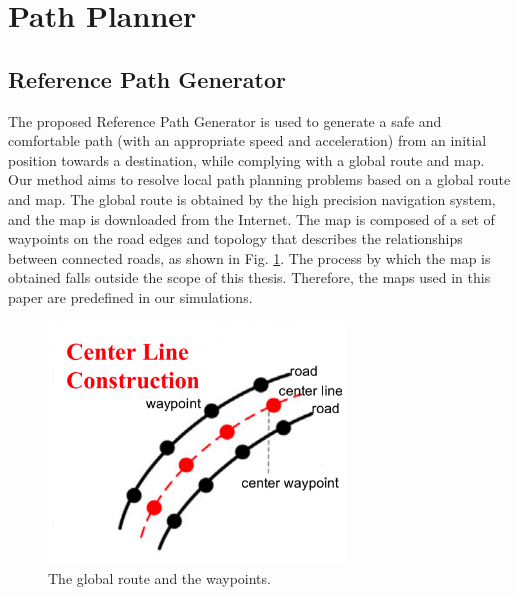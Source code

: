 \section{Path Planner}

\subsection{Reference Path Generator}

The proposed Reference Path Generator is used to generate a safe and comfortable path (with an appropriate speed and acceleration) from an initial position towards a destination, while complying with a global route and map. Our method aims to resolve local path planning problems based on a global route and map. The global route is obtained by the high precision navigation system, and the map is downloaded from the Internet. The map is composed of a set of waypoints on the road edges and topology that describes the relationships between connected roads, as shown in Fig. \ref{fig:center-line}. The process by which the map is obtained falls outside the scope of this thesis. Therefore, the maps used in this paper are predefined in our simulations.

\begin{figure}[h]
\centering
\includegraphics[width=0.7\textwidth]{figs/ch3/center-line}
\caption{The global route and the waypoints.}
\label{fig:center-line}
\end{figure}


